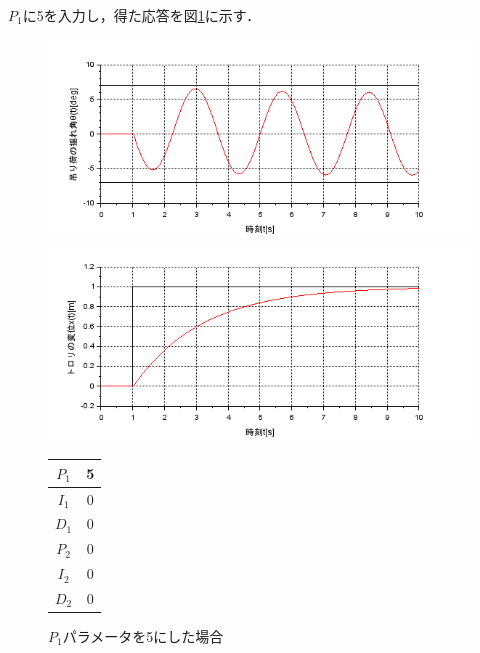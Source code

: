 \documentclass[dvipdfmx,titlepage,a4j]{jsarticle}  %
\begin{document}
$P_1$に5を入力し，得た応答を図\ref{fig:crane:1}に示す．
\begin{figure}[H]
  \begin{minipage}{4.5cm}
    \centering
    \includegraphics[keepaspectratio, scale=0.35]{../graph/crane/ang-P1-5-I1-0-D1-0-P2-0-I2-0-D2-0.png}
  \end{minipage}
  \hfill
  \begin{minipage}{4.5cm}
    \centering
    \includegraphics[keepaspectratio, scale=0.35]{../graph/crane/po-P1-5-I1-0-D1-0-P2-0-I2-0-D2-0.png}
  \end{minipage}
  \hfill
  \begin{minipage}{3cm}
    \begin{center}
      \begin{tabular}{c|c}
        \hline
        $P_1$ & 5\\ \hline
        $I_1$ & 0\\ \hline
        $D_1$ & 0\\ \hline
        $P_2$ & 0\\ \hline
        $I_2$ & 0\\ \hline
        $D_2$ & 0\\
        \hline
      \end{tabular}
    \end{center}
  \end{minipage}
  \hfill
  \caption{$P_1$パラメータを5にした場合}
  \label{fig:crane:1}
\end{figure}
\end{document}
